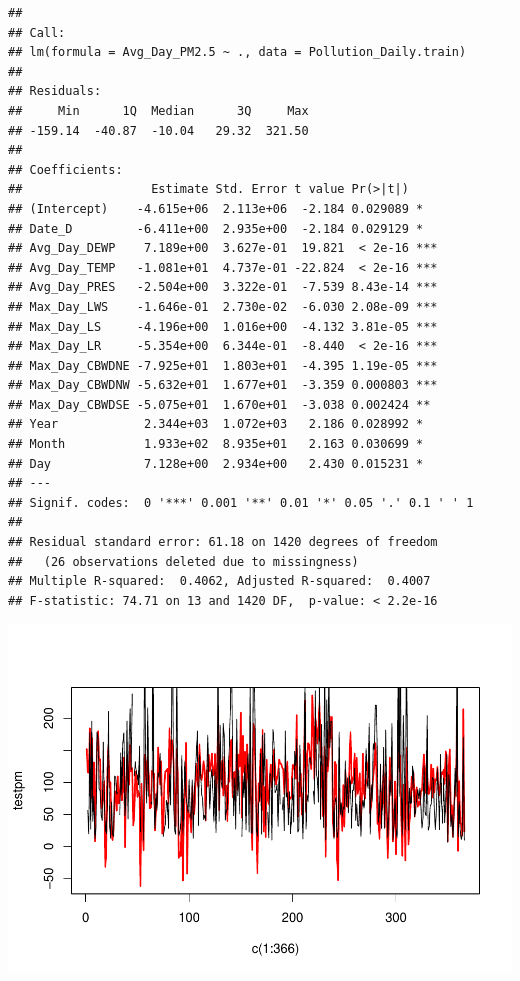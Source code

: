 \documentclass[
]{article}
\begin{document}
\begin{verbatim}
## 
## Call:
## lm(formula = Avg_Day_PM2.5 ~ ., data = Pollution_Daily.train)
## 
## Residuals:
##     Min      1Q  Median      3Q     Max 
## -159.14  -40.87  -10.04   29.32  321.50 
## 
## Coefficients:
##                  Estimate Std. Error t value Pr(>|t|)    
## (Intercept)    -4.615e+06  2.113e+06  -2.184 0.029089 *  
## Date_D         -6.411e+00  2.935e+00  -2.184 0.029129 *  
## Avg_Day_DEWP    7.189e+00  3.627e-01  19.821  < 2e-16 ***
## Avg_Day_TEMP   -1.081e+01  4.737e-01 -22.824  < 2e-16 ***
## Avg_Day_PRES   -2.504e+00  3.322e-01  -7.539 8.43e-14 ***
## Max_Day_LWS    -1.646e-01  2.730e-02  -6.030 2.08e-09 ***
## Max_Day_LS     -4.196e+00  1.016e+00  -4.132 3.81e-05 ***
## Max_Day_LR     -5.354e+00  6.344e-01  -8.440  < 2e-16 ***
## Max_Day_CBWDNE -7.925e+01  1.803e+01  -4.395 1.19e-05 ***
## Max_Day_CBWDNW -5.632e+01  1.677e+01  -3.359 0.000803 ***
## Max_Day_CBWDSE -5.075e+01  1.670e+01  -3.038 0.002424 ** 
## Year            2.344e+03  1.072e+03   2.186 0.028992 *  
## Month           1.933e+02  8.935e+01   2.163 0.030699 *  
## Day             7.128e+00  2.934e+00   2.430 0.015231 *  
## ---
## Signif. codes:  0 '***' 0.001 '**' 0.01 '*' 0.05 '.' 0.1 ' ' 1
## 
## Residual standard error: 61.18 on 1420 degrees of freedom
##   (26 observations deleted due to missingness)
## Multiple R-squared:  0.4062, Adjusted R-squared:  0.4007 
## F-statistic: 74.71 on 13 and 1420 DF,  p-value: < 2.2e-16
\end{verbatim}

\includegraphics{Final_Project_1_files/figure-latex/unnamed-chunk-6-1.pdf}
\end{document}
